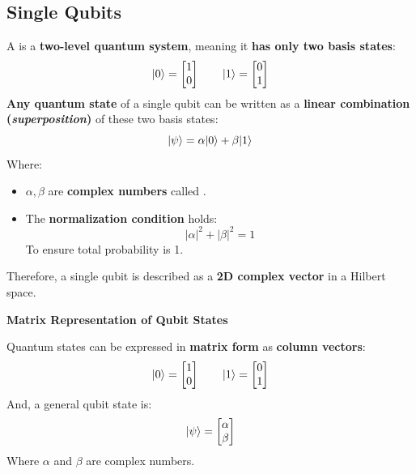 \subsection{Single Qubits}

A  is a \textbf{two-level quantum system}, meaning it \textbf{has only two basis states}:
\begin{equation*}
    | 0 \rangle = \begin{bmatrix}
        1 \\ 0
    \end{bmatrix}
    \hspace{2em}
    | 1 \rangle = \begin{bmatrix}
        0 \\ 1
    \end{bmatrix}
\end{equation*}
\textbf{Any quantum state} of a single qubit can be written as a \textbf{linear combination (\emph{superposition})} of these two basis states:
\begin{equation*}
    | \psi \rangle = \alpha | 0 \rangle + \beta | 1 \rangle
\end{equation*}
Where:
\begin{itemize}
    \item $\alpha, \beta$ are \textbf{complex numbers} called .
    \item The \textbf{normalization condition} holds:
    \begin{equation*}
        \left|\alpha\right|^{2} + \left|\beta\right|^{2} = 1
    \end{equation*}
    To ensure total probability is 1.
\end{itemize}
Therefore, a single qubit is described as a \textbf{2D complex vector} in a Hilbert space.

\begin{flushleft}
    \textcolor{Green3}{ \textbf{Matrix Representation of Qubit States}}
\end{flushleft}
Quantum states can be expressed in \textbf{matrix form} as \textbf{column vectors}:
\begin{equation*}
    | 0 \rangle = \begin{bmatrix}
        1 \\ 0
    \end{bmatrix}
    \hspace{2em}
    | 1 \rangle = \begin{bmatrix}
        0 \\ 1
    \end{bmatrix}
\end{equation*}
And, a general qubit state is:
\begin{equation*}
    | \psi \rangle = \begin{bmatrix}
        \alpha \\ \beta
    \end{bmatrix}
\end{equation*}
Where $\alpha$ and $\beta$ are complex numbers.

